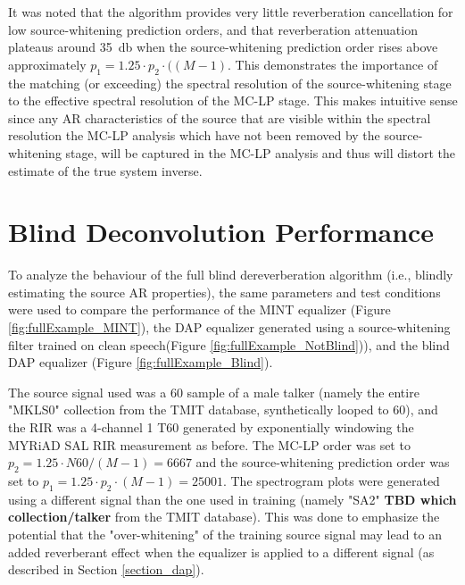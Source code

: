 It was noted that the algorithm provides very little reverberation cancellation for low source-whitening prediction orders, and that reverberation attenuation plateaus around \qty{35}{\decibel} when the source-whitening prediction order rises above approximately $p_1 = 1.25 \cdot p_2 \cdot (\left(M-1\right)$. This demonstrates the importance of the matching (or exceeding) the spectral resolution of the source-whitening stage to the effective spectral resolution of the MC-LP stage. This makes intuitive sense since any AR characteristics of the source that are visible within the spectral resolution the MC-LP analysis which have not been removed by the source-whitening stage, will be captured in the MC-LP analysis and thus will distort the estimate of the true system inverse.

\section{Blind Deconvolution Performance}

To analyze the behaviour of the full blind dereverberation algorithm (i.e., blindly estimating the source AR properties), the same parameters and test conditions were used to compare the performance of the MINT equalizer (Figure \ref{fig:fullExample_MINT}), the DAP equalizer generated using a source-whitening filter trained on clean speech(Figure \ref{fig:fullExample_NotBlind})), and the blind DAP equalizer (Figure \ref{fig:fullExample_Blind}). 

The source signal used was a \qty{60}{\sec} sample of a male talker (namely the entire "MKLS0" collection from the TMIT database, synthetically looped to \qty{60}{\sec}), and the RIR was a 4-channel \qty{1}{\sec} T60 generated by exponentially windowing the MYRiAD SAL RIR measurement as before. The MC-LP order was set to $p_2 = 1.25 \cdot N60 / \left(M-1\right)=6667$ and the source-whitening prediction order was set to $p_1 = 1.25 \cdot p_2 \cdot \left(M-1\right)=25001$. The spectrogram plots were generated using a different signal than the one used in training (namely "SA2" \textbf{TBD which collection/talker} from the TMIT database). This was done to emphasize the potential that the "over-whitening" of the training source signal may lead to an added reverberant effect when the equalizer is applied to a different signal (as described in Section \ref{section_dap}).

%

